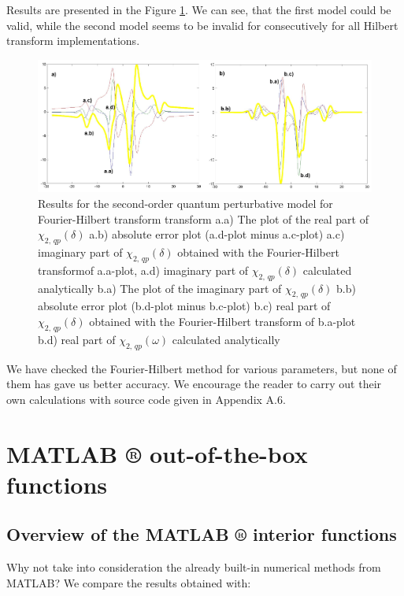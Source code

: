 \documentclass[12pt,twoside,a4paper]{article}
\numberwithin{equation}{subsection}
\numberwithin{figure}{subsection}
\begin{document}
Results are presented in the Figure \ref{fig:four_qp2}. We can see, that the first model could be valid, while the second model seems to be
invalid for consecutively for all Hilbert transform implementations.

\begin{figure} 
  \includegraphics[width=150mm]{img/four_qp2.png}
  \caption{Results for the second-order quantum perturbative model for Fourier-Hilbert transform transform
     a.a) The plot of the real part of ${\chi_{2, \,qp}}(\delta )$
     a.b) absolute error plot (a.d-plot minus a.c-plot)
     a.c) imaginary part of ${\chi_{2, \,qp}}(\delta )$ obtained with the Fourier-Hilbert transformof a.a-plot, 
     a.d) imaginary part of ${\chi_{2, \,qp}}(\delta )$ calculated analytically 
     b.a) The plot of the imaginary part of ${\chi_{2, \,qp}}(\delta )$ 
     b.b) absolute error plot (b.d-plot minus b.c-plot)
     b.c) real part of ${\chi_{2, \,qp}}(\delta )$ obtained with the Fourier-Hilbert transform of b.a-plot 
     b.d) real part of $\chi_{2, \,qp} (\omega )$ calculated analytically 
     \label{fig:four_qp2}
     }
\end{figure} 

We have checked the Fourier-Hilbert method for various parameters, but none of them has gave us better accuracy. We
encourage the reader to carry out their own calculations with source code given in Appendix A.6.

\section{MATLAB ® out-of-the-box functions} \label{chap:matlab}

\subsection{Overview of the MATLAB ® interior functions} \label{chap:matlab_overview}

Why not take into consideration the already built-in numerical methods from MATLAB? We compare the results obtained with: 
\end{document}

